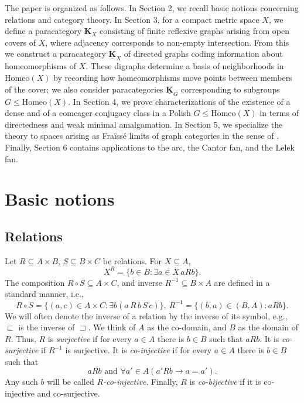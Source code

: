 \documentclass[12pt]{amsart}
\numberwithin{equation}{section}
\theoremstyle{plain}
\theoremstyle{definition}
\newcommand \Homeo{ \mbox{Homeo}}
\newcommand \sqsp{\sqsupset}
\newcommand \sqsb{\sqsubset}
\newcommand \KKb{\mathbf{K}}
\newcommand \KKub{\underline{\mathbf{K}}}
\begin{document}
The paper is organized as follows. In Section 2, we recall basic notions concerning relations and category theory. In Section 3, for a compact metric space $X$, we define a paracategory $\KKb_X$ consisting of finite reflexive graphs arising from open covers of $X$, where adjacency corresponds to non-empty intersection. From this we construct a paracategory $\KKub_X$ of directed graphs coding information about homeomorphisms of $X$. These digraphs determine a basis of neighborhoods in $\Homeo(X)$ by recording how homeomorphisms move points between members of the cover; we also consider paracategories $\KKub_G$ corresponding to subgroups $G \leq \Homeo(X)$. In Section 4, we prove characterizations of the existence of a dense and of a comeager conjugacy class in a Polish $G \leq \Homeo(X)$ in terms of directedness and weak minimal amalgamation. In Section 5, we specialize the theory to spaces arising as Fra\"iss\'e limits of graph categories in the sense of \cite{BaBiVi2}. Finally, Section 6 contains applications to the arc, the Cantor fan, and the Lelek fan.

\section{Basic notions}
\subsection{Relations}
Let $R \subseteq A \times B$, $S \subseteq B \times C$ be relations. For $X \subseteq A$, $$X^R=\{b \in B: \exists a \in X \, a R b\}.$$ The composition $R \circ S \subseteq A \times C$, and inverse $R^{-1} \subseteq B \times A$ are defined in a standard manner, i.e., $$R \circ S =\{ (a,c) \in A \times C: \exists b (a \, R \, b \, S \, c)\}, \ R^{-1}=\{(b,a) \in (B,A): aRb\}.$$ 
%
We will often denote the inverse of a relation by the inverse of its symbol, e.g., $\sqsb$ is the inverse of $\sqsp$.
We think of $A$ as the co-domain, and $B$ as the domain of $R$. Thus, $R$ is \emph{surjective} if for every $a \in A$ there is $b \in B$ such that $aRb$. It is \emph{co-surjective} if $R^{-1}$ is surjective. It is \emph{co-injective} if for every $a \in A$ there is $b \in B$ such that  
%
$$ aRb \mbox{ and } \forall a' \in A (a'Rb \rightarrow a=a').$$
%
Any such $b$ will be called  \emph{$R$-co-injective}. Finally, $R$ is \emph{co-bijective} if it is co-injective and co-surjective.
\end{document}
